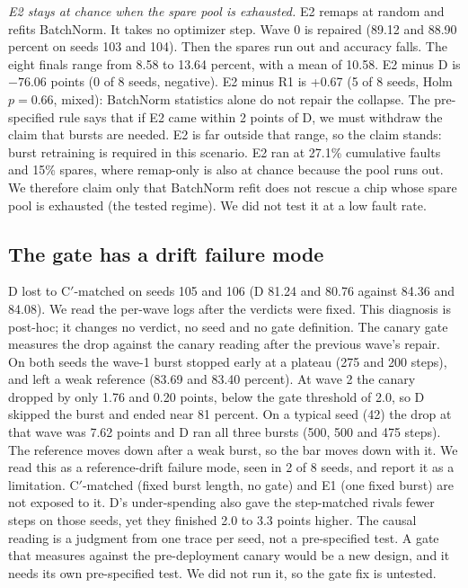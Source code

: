\documentclass[journal]{IEEEtran}
\begin{document}
\emph{E2 stays at chance when the spare pool is exhausted.}
E2 remaps at random and refits BatchNorm.
It takes no optimizer step.
Wave 0 is repaired (89.12 and 88.90 percent on seeds 103 and 104).
Then the spares run out and accuracy falls.
The eight finals range from 8.58 to 13.64 percent, with a mean of 10.58.
E2 minus D is $-76.06$ points (0 of 8 seeds, negative).
E2 minus R1 is +0.67 (5 of 8 seeds, Holm $p=0.66$, mixed): BatchNorm statistics alone do not repair the collapse.
The pre-specified rule says that if E2 came within 2 points of D, we must withdraw the claim that bursts are needed.
E2 is far outside that range, so the claim stands: burst retraining is required in this scenario.
E2 ran at 27.1\% cumulative faults and 15\% spares, where remap-only is also at chance because the pool runs out.
We therefore claim only that BatchNorm refit does not rescue a chip whose spare pool is exhausted (the tested regime).
We did not test it at a low fault rate.

\subsection{The gate has a drift failure mode}
\label{sec:gate}
D lost to C$'$-matched on seeds 105 and 106 (D 81.24 and 80.76 against 84.36 and 84.08).
We read the per-wave logs after the verdicts were fixed.
This diagnosis is post-hoc; it changes no verdict, no seed and no gate definition.
The canary gate measures the drop against the canary reading after the previous wave's repair.
On both seeds the wave-1 burst stopped early at a plateau (275 and 200 steps), and left a weak reference (83.69 and 83.40 percent).
At wave 2 the canary dropped by only 1.76 and 0.20 points, below the gate threshold of 2.0, so D skipped the burst and ended near 81 percent.
On a typical seed (42) the drop at that wave was 7.62 points and D ran all three bursts (500, 500 and 475 steps).
The reference moves down after a weak burst, so the bar moves down with it.
We read this as a reference-drift failure mode, seen in 2 of 8 seeds, and report it as a limitation.
C$'$-matched (fixed burst length, no gate) and E1 (one fixed burst) are not exposed to it.
D's under-spending also gave the step-matched rivals fewer steps on those seeds, yet they finished 2.0 to 3.3 points higher.
The causal reading is a judgment from one trace per seed, not a pre-specified test.
A gate that measures against the pre-deployment canary would be a new design, and it needs its own pre-specified test.
We did not run it, so the gate fix is untested.
\end{document}
